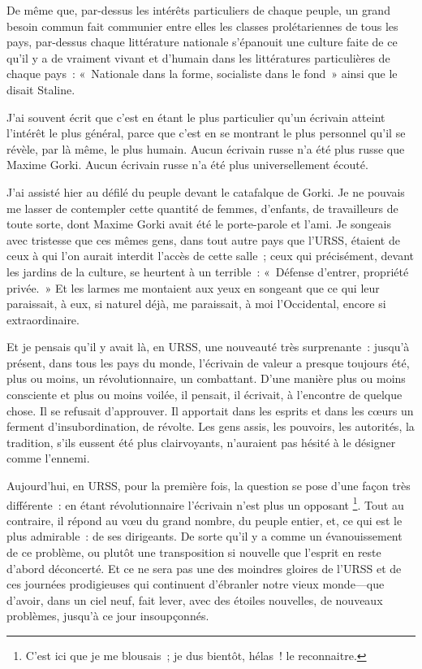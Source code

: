 \documentclass[twoside]{book} %
\begin{document}
De même que, par-dessus les intérêts particuliers de chaque peuple, un grand besoin commun fait communier entre elles les classes prolétariennes de tous les pays, par-dessus chaque littérature nationale s’épanouit une culture faite de ce qu’il y a de vraiment vivant et d’humain dans les littératures particulières de chaque pays : « Nationale dans la forme, socialiste dans le fond » ainsi que le disait Staline.\par
J’ai souvent écrit que c’est en étant le plus particulier qu’un écrivain atteint l’intérêt le plus général, parce que c’est en se montrant le plus personnel qu’il se révèle, par là même, le plus humain. Aucun écrivain russe n’a été plus russe que Maxime Gorki. Aucun écrivain russe n’a été plus universellement écouté.\par
J’ai assisté hier au défilé du peuple devant le catafalque de Gorki. Je ne pouvais me lasser de contempler cette quantité de femmes, d’enfants, de travailleurs de toute sorte, dont Maxime Gorki avait été le porte-parole et l’ami. Je songeais avec tristesse que ces mêmes gens, dans tout autre pays que l’URSS, étaient de ceux à qui l’on aurait interdit l’accès de cette salle ; ceux qui précisément, devant les jardins de la culture, se heurtent à un terrible : « Défense d’entrer, propriété privée. » Et les larmes me montaient aux yeux en songeant que ce qui leur paraissait, à eux, si naturel déjà, me paraissait, à moi l’Occidental, encore si extraordinaire.\par
Et je pensais qu’il y avait là, en URSS, une nouveauté très surprenante : jusqu’à présent, dans tous les pays du monde, l’écrivain de valeur a presque toujours été, plus ou moins, un révolutionnaire, un combattant. D’une manière plus ou moins consciente et plus ou moins voilée, il pensait, il écrivait, à l’encontre de quelque chose. Il se refusait d’approuver. Il apportait dans les esprits et dans les cœurs un ferment d’insubordination, de révolte. Les gens assis, les pouvoirs, les autorités, la tradition, s’ils eussent été plus clairvoyants, n’auraient pas hésité à le désigner comme l’ennemi.\par
Aujourd’hui, en URSS, pour la première fois, la question se pose d’une façon très différente : en étant révolutionnaire l’écrivain n’est plus un opposant \footnote{C’est ici que je me blousais ; je dus bientôt, hélas ! le reconnaitre.}. Tout au contraire, il répond au vœu du grand nombre, du peuple entier, et, ce qui est le plus admirable : de ses dirigeants. De sorte qu’il y a comme un évanouissement de ce problème, ou plutôt une transposition si nouvelle que l’esprit en reste d’abord déconcerté. Et ce ne sera pas une des moindres gloires de l’URSS et de ces journées prodigieuses qui continuent d’ébranler notre vieux monde—que d’avoir, dans un ciel neuf, fait lever, avec des étoiles nouvelles, de nouveaux problèmes, jusqu’à ce jour insoupçonnés.\par
\end{document}

